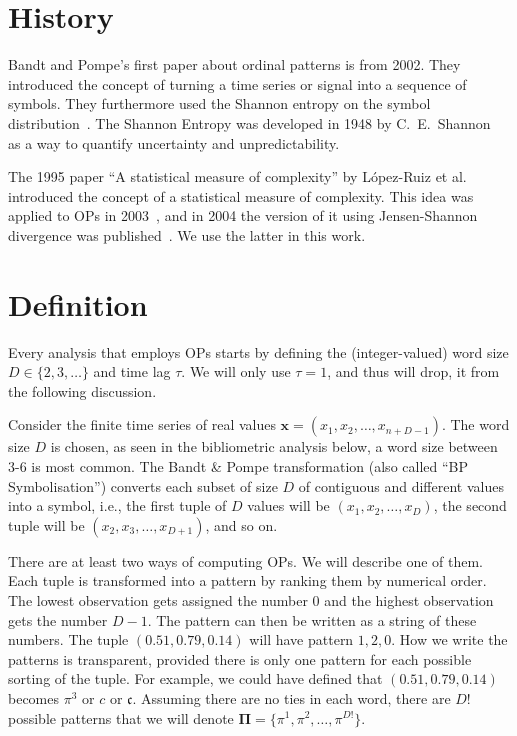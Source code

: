 \section{History}
Bandt and Pompe's first paper about ordinal patterns is from 2002. 
They introduced the concept of turning a time series or signal into a sequence of symbols. 
They furthermore used the Shannon entropy on the symbol distribution~\cite{Bandt2002}. 
The Shannon Entropy was developed in 1948 by C.\ E.\ Shannon~\cite{Shannon1948} as a way to quantify uncertainty and unpredictability.

The 1995 paper ``A statistical measure of complexity'' by López-Ruiz et al.~\cite{LopezRuiz1995} introduced the concept of a statistical measure of complexity. 
This idea was applied to OPs in 2003~\cite{Martin2003}, and in 2004 the version of it using Jensen-Shannon divergence was published~\cite{Lamberti2004}.
We use the latter in this work.

\section{Definition}

Every analysis that employs OPs starts by defining the (integer-valued) word size $D\in\{2,3,\dots\}$ and time lag $\tau$.
We will only use $\tau=1$, and thus will drop, it from the following discussion.

Consider the finite time series of real values $\bm x=(x_1, x_2,\dots, x_{n+D-1})$. 
The word size $D$ is chosen, as seen in the bibliometric analysis below, a word size between 3-6 is most common.
The Bandt \& Pompe transformation (also called ``BP Symbolisation'') converts each subset of size $D$ of contiguous and different values into a symbol, i.e.,
the first tuple of $D$ values will be $(x_1,x_2,\dots,x_{D})$, 
the second tuple will be $(x_2, x_3,\dots,x_{D+1})$, and so on.

There are at least two ways of computing OPs.
We will describe one of them.
Each tuple is transformed into a pattern by ranking them by numerical order. 
The lowest observation gets assigned the number $0$ and the highest observation gets the number $D-1$. 
The pattern can then be written as a string of these numbers. 
The tuple $(0.51, 0.79, 0.14)$ will have pattern $1,2,0$.
How we write the patterns is transparent, provided there is only one pattern for each possible sorting of the tuple.
For example, we could have defined that $(0.51, 0.79, 0.14)$ becomes $\pi^3$ or $c$ or $\mathfrak{c}$.
Assuming there are no ties in each word, there are $D!$ possible patterns that we will denote $\bm\Pi=\{\pi^1,\pi^2,\dots,\pi^{D!}\}$.


